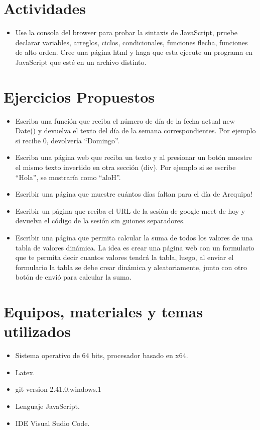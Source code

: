\documentclass{article}
\begin{document}
	\section{Actividades}
	\begin{itemize}		
		\item Use la consola del browser para probar la sintaxis de JavaScript, pruebe declarar variables, arreglos, ciclos, condicionales, funciones flecha, funciones de alto orden.
		Cree una página  html y haga que esta ejecute un programa en JavaScript que esté en un archivo distinto.
	\end{itemize}
	\section{Ejercicios Propuestos}
	\begin{itemize}		
		\item Escriba una función que reciba el número de día de la fecha actual new Date()  y devuelva el texto del día de la semana correspondientes. Por ejemplo si recibe 0, devolvería “Domingo”.
		
		\item Escriba una página web que reciba un texto y al presionar un botón muestre el mismo texto invertido en otra sección (div). Por ejemplo si se escribe “Hola”, se mostraría como “aloH”.
		\item Escribir una página que muestre cuántos días faltan para el día de Arequipa!
		\item Escribir un página que reciba el URL de la sesión de google meet de hoy y devuelva el código de la sesión sin guiones separadores.
		\item Escribir una página que permita calcular la suma de todos los valores de una tabla de valores dinámica. La idea es crear una página web con un formulario que te permita decir cuantos valores tendrá la tabla, luego, al enviar el formulario la tabla se debe crear dinámica y aleatoriamente, junto con otro botón de envió para calcular la suma.
	\end{itemize}
	
	\section{Equipos, materiales y temas utilizados}
	\begin{itemize}
		\item Sistema operativo de 64 bits, procesador basado en x64.
		\item Latex. 
		\item git version 2.41.0.windows.1
		\item Lenguaje JavaScript.
		\item IDE Visual Sudio Code.
	\end{itemize}
\end{document}
